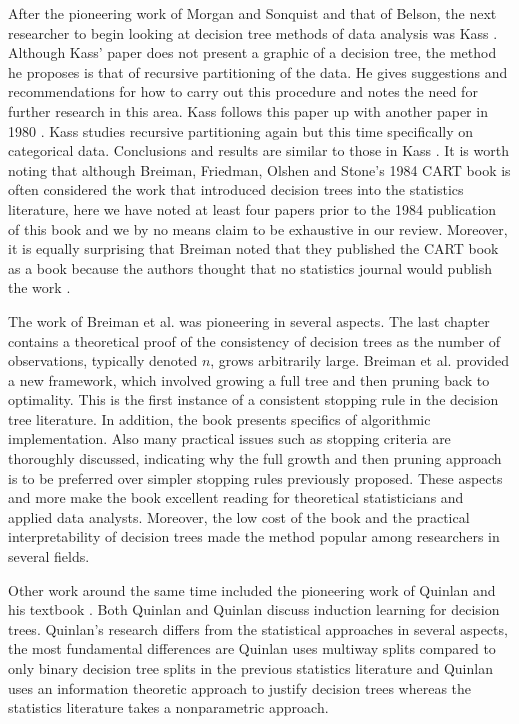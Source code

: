After the pioneering work of Morgan and Sonquist and that of Belson, the next researcher to begin looking at decision tree methods of data analysis was Kass \cite{kass1975significance}. Although Kass' paper does not present a graphic of a decision tree, the method he proposes is that of recursive partitioning of the data. He gives suggestions and recommendations for how to carry out this procedure and notes the need for further research in this area. Kass follows this paper up with another paper in 1980 \cite{kass1980exploratory}. Kass \cite{kass1980exploratory} studies recursive partitioning again but this time specifically on categorical data. Conclusions and results are similar to those in Kass \cite{kass1975significance}. It is worth noting that although Breiman, Friedman, Olshen and Stone's 1984 CART book \cite{breiman1984classification} is often considered the work that introduced decision trees into the statistics literature, here we have noted at least four papers prior to the 1984 publication of this book and we by no means claim to be exhaustive in our review.  Moreover, it is equally surprising that Breiman noted that they published the CART book as a book because the authors thought that no statistics journal would publish the work \cite{friedman2011remembering}.  

The work of Breiman et al. \cite{breiman1984classification} was pioneering in several aspects. The last chapter contains a theoretical proof of the consistency of decision trees as the number of observations, typically denoted $n$, grows arbitrarily large. Breiman et al. provided a new framework, which involved growing a full tree and then pruning back to optimality. This is the first instance of a consistent stopping rule in the decision tree literature. In addition, the book presents specifics of algorithmic implementation. Also many practical issues such as stopping criteria are thoroughly discussed, indicating why the full growth and then pruning approach is to be preferred over simpler stopping rules previously proposed. These aspects and more make the book excellent reading for theoretical statisticians and applied data analysts. Moreover, the low cost of the book and the practical interpretability of decision trees made the method popular among researchers in several fields.

Other work around the same time included the pioneering work of Quinlan \cite{quinlan1986induction} and his textbook \cite{quinlan1993c4}. Both Quinlan \cite{quinlan1986induction}and Quinlan \cite{quinlan1993c4} discuss induction learning for decision trees. Quinlan's research differs from the statistical approaches in several aspects, the most fundamental differences are Quinlan uses multiway splits compared to only binary decision tree splits in the previous statistics literature and Quinlan uses an information theoretic approach to justify decision trees whereas the statistics literature takes a nonparametric approach.  

